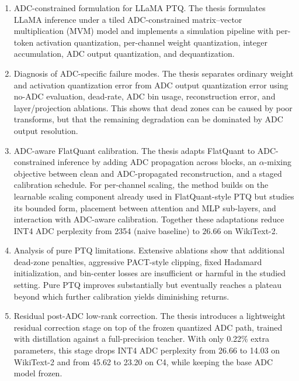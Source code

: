 \documentclass[a4paper,11pt,oneside]{article}
\theoremstyle{breakstyle}
\begin{document}
\begin{enumerate}
    \item ADC-constrained formulation for LLaMA PTQ.
    The thesis formulates LLaMA inference under a tiled ADC-constrained
    matrix--vector multiplication (MVM) model and implements a
    simulation pipeline with per-token
    activation quantization, per-channel weight quantization, integer
    accumulation, ADC output quantization, and dequantization.

    \item Diagnosis of ADC-specific failure modes.
    The thesis separates ordinary weight and activation quantization error
    from ADC output quantization error using no-ADC evaluation,
    dead-rate, ADC bin usage, reconstruction error, and layer/projection
    ablations. This shows that dead zones can be caused by poor
    transforms, but that the remaining degradation can be dominated by
    ADC output resolution.

    \item ADC-aware FlatQuant calibration.
    The thesis adapts FlatQuant to ADC-constrained inference by
    adding ADC propagation across blocks, an $\alpha$-mixing
    objective between clean and ADC-propagated reconstruction, and a
    staged calibration schedule.  For per-channel scaling, the
    method builds on the learnable scaling component already used
    in FlatQuant-style PTQ but studies its bounded form, placement
    between attention and MLP sub-layers, and interaction with
    ADC-aware calibration.  Together these adaptations reduce INT4
    ADC perplexity from 2354 (naive baseline) to $26.66$ on
    WikiText-2.

    \item Analysis of pure PTQ limitations.
    Extensive ablations show that additional dead-zone penalties,
    aggressive PACT-style clipping, fixed Hadamard initialization, and
    bin-center losses are insufficient or harmful in the studied setting.
    Pure PTQ improves substantially but eventually reaches a plateau
    beyond which further calibration yields diminishing returns.

    \item Residual post-ADC low-rank correction.
    The thesis introduces a lightweight residual correction stage on top
    of the frozen quantized ADC path, trained with distillation against
    a full-precision teacher. With only 0.22\% extra parameters, this
    stage drops INT4 ADC perplexity from 26.66 to 14.03 on WikiText-2
    and from 45.62 to 23.20 on C4, while keeping the base ADC model
    frozen.
\end{enumerate}
\end{document}
